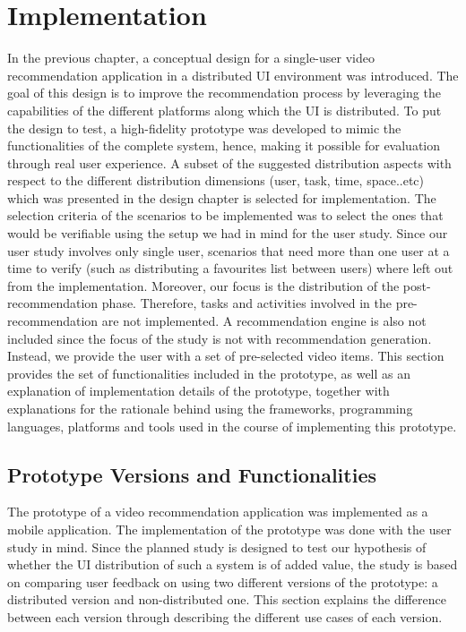 \chapter{Implementation}\label{chapter:impl}
In the previous chapter, a conceptual design for a single-user video recommendation application in a distributed UI environment was introduced. The goal of this design is to improve the recommendation process by leveraging the capabilities of the different platforms along which the UI is distributed. To put the design to test, a high-fidelity prototype was developed to mimic the functionalities of the complete system, hence, making it possible for evaluation through real user experience. A subset of the suggested distribution aspects with respect to the different distribution dimensions (user, task, time, space..etc) which was presented in the design chapter is selected for implementation. The selection criteria of the scenarios to be implemented was to select the ones that would be verifiable using the setup we had in mind for the user study. Since our user study involves only single user, scenarios that need more than  one user at a time to verify (such as distributing a favourites list between users) where left out from the implementation. Moreover, our focus is the distribution of the post-recommendation phase. Therefore, tasks and activities involved in the pre-recommendation are not implemented. A recommendation engine is also not included since the focus of the study is not with recommendation generation. Instead, we provide the user with a set of pre-selected video items. This section provides the set of functionalities included in the prototype, as well as an explanation of implementation details of the prototype, together with explanations for the rationale behind using the frameworks, programming languages, platforms and tools used in the course of implementing this prototype. 
 
\section{Prototype Versions and Functionalities}
The prototype of a video recommendation application was implemented as a mobile application. The implementation of the prototype was done with the user study in mind. Since the planned study is designed to test our hypothesis of whether the UI distribution of such a system is of added value, the study is based on comparing user feedback on using two different versions of the prototype: a distributed version and non-distributed one. This section explains the difference between each version through describing the different use cases of each version.
